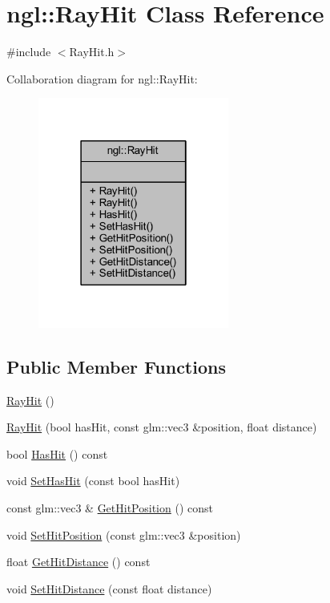 \hypertarget{classngl_1_1_ray_hit}{}\section{ngl\+:\+:Ray\+Hit Class Reference}
\label{classngl_1_1_ray_hit}


{\ttfamily \#include $<$Ray\+Hit.\+h$>$}



Collaboration diagram for ngl\+:\+:Ray\+Hit\+:
\nopagebreak
\begin{figure}[H]
\begin{center}
\leavevmode
\includegraphics[width=178pt]{classngl_1_1_ray_hit__coll__graph}
\end{center}
\end{figure}
\subsection*{Public Member Functions}
\begin{DoxyCompactItemize}
\item 
\mbox{\hyperlink{classngl_1_1_ray_hit_aaf89c940848ce037c5f894e98f9be065}{Ray\+Hit}} ()
\item 
\mbox{\hyperlink{classngl_1_1_ray_hit_a0e89f959910525289e9667078b128e63}{Ray\+Hit}} (bool has\+Hit, const glm\+::vec3 \&position, float distance)
\item 
bool \mbox{\hyperlink{classngl_1_1_ray_hit_a74b7f71e8610ea63941cff99e773961c}{Has\+Hit}} () const
\item 
void \mbox{\hyperlink{classngl_1_1_ray_hit_a899a034da37fc875fea691505294f71d}{Set\+Has\+Hit}} (const bool has\+Hit)
\item 
const glm\+::vec3 \& \mbox{\hyperlink{classngl_1_1_ray_hit_a9e963f543bca4f205409ea9b416e01bc}{Get\+Hit\+Position}} () const
\item 
void \mbox{\hyperlink{classngl_1_1_ray_hit_a8619add65dbfd95308bfc5d82389e903}{Set\+Hit\+Position}} (const glm\+::vec3 \&position)
\item 
float \mbox{\hyperlink{classngl_1_1_ray_hit_a927b2f9c95c1553498232af98d3a5725}{Get\+Hit\+Distance}} () const
\item 
void \mbox{\hyperlink{classngl_1_1_ray_hit_a17e409f87f691321d731879c9def7973}{Set\+Hit\+Distance}} (const float distance)
\end{DoxyCompactItemize}


